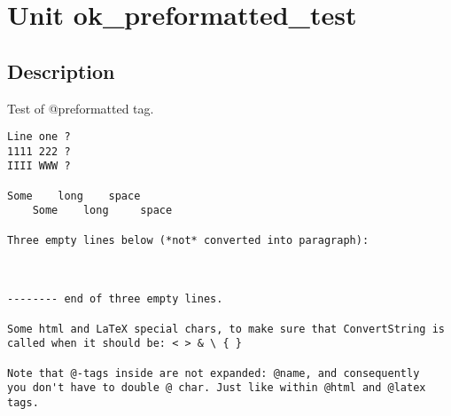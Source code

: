 \documentclass{report}
\begin{document}
\newlength{\tmplength}
\chapter{Unit ok{\_}preformatted{\_}test}
\section{Description}
Test of @preformatted tag.\hfill\vspace*{1ex}



\begin{verbatim}
Line one ?
1111 222 ?
IIII WWW ?

Some    long    space
    Some    long     space

Three empty lines below (*not* converted into paragraph):



-------- end of three empty lines.

Some html and LaTeX special chars, to make sure that ConvertString is
called when it should be: < > & \ { }

Note that @-tags inside are not expanded: @name, and consequently
you don't have to double @ char. Just like within @html and @latex
tags.\end{verbatim}
\end{document}
